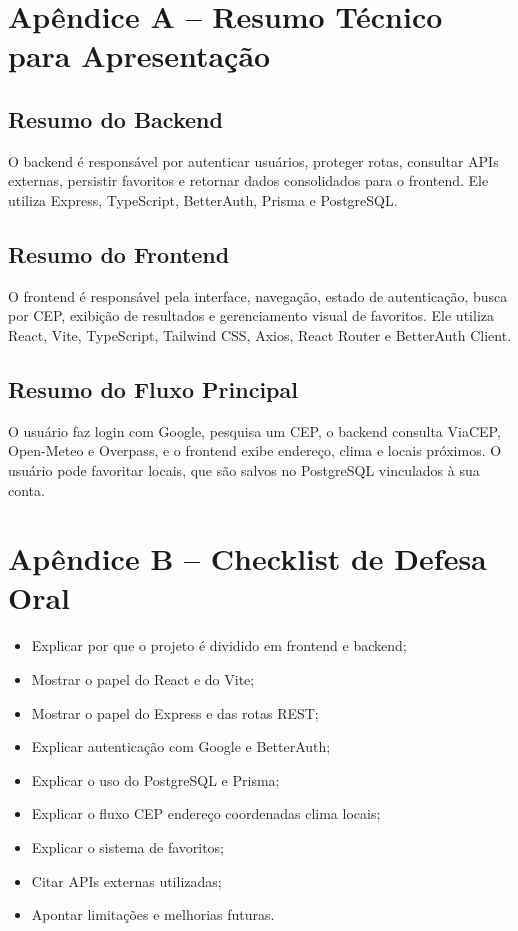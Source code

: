 \documentclass[
    12pt,
    oneside,
    openright,
    a4paper,
    english,
    brazil
]{abntex2}
\begin{document}
\appendix

\chapter{Apêndice A -- Resumo Técnico para Apresentação}

\section{Resumo do Backend}

O backend é responsável por autenticar usuários, proteger rotas, consultar APIs externas, persistir favoritos e retornar dados consolidados para o frontend. Ele utiliza Express, TypeScript, BetterAuth, Prisma e PostgreSQL.

\section{Resumo do Frontend}

O frontend é responsável pela interface, navegação, estado de autenticação, busca por CEP, exibição de resultados e gerenciamento visual de favoritos. Ele utiliza React, Vite, TypeScript, Tailwind CSS, Axios, React Router e BetterAuth Client.

\section{Resumo do Fluxo Principal}

O usuário faz login com Google, pesquisa um CEP, o backend consulta ViaCEP, Open-Meteo e Overpass, e o frontend exibe endereço, clima e locais próximos. O usuário pode favoritar locais, que são salvos no PostgreSQL vinculados à sua conta.

\chapter{Apêndice B -- Checklist de Defesa Oral}

\begin{itemize}
    \item Explicar por que o projeto é dividido em frontend e backend;
    \item Mostrar o papel do React e do Vite;
    \item Mostrar o papel do Express e das rotas REST;
    \item Explicar autenticação com Google e BetterAuth;
    \item Explicar o uso do PostgreSQL e Prisma;
    \item Explicar o fluxo CEP \textrightarrow endereço \textrightarrow coordenadas \textrightarrow clima \textrightarrow locais;
    \item Explicar o sistema de favoritos;
    \item Citar APIs externas utilizadas;
    \item Apontar limitações e melhorias futuras.
\end{itemize}

\end{document}
